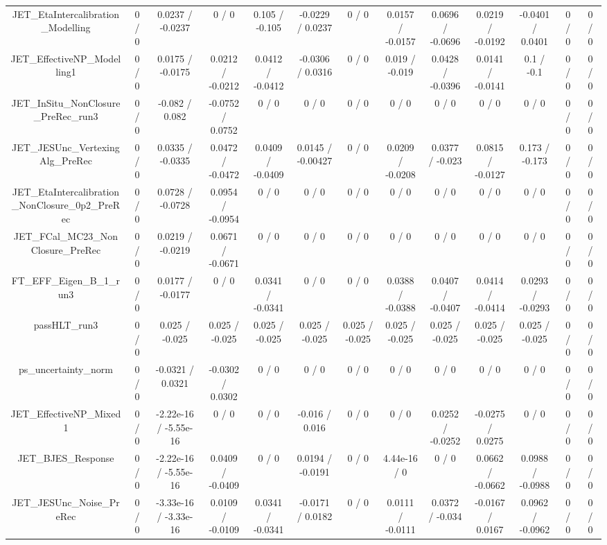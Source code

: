 \documentclass[10pt]{article}
\begin{document}
\begin{table}[htbp]
\begin{center}
\begin{tabular}{|c|c|c|c|c|c|c|c|c|c|c|c|c|}
  JET_EtaIntercalibration_Modelling & 0 / 0 & 0.0237 / -0.0237 & 0 / 0 & 0.105 / -0.105 & -0.0229 / 0.0237 & 0 / 0 & 0.0157 / -0.0157 & 0.0696 / -0.0696 & 0.0219 / -0.0192 & -0.0401 / 0.0401 & 0 / 0 & 0 / 0 \\ 
  JET_EffectiveNP_Modelling1 & 0 / 0 & 0.0175 / -0.0175 & 0.0212 / -0.0212 & 0.0412 / -0.0412 & -0.0306 / 0.0316 & 0 / 0 & 0.019 / -0.019 & 0.0428 / -0.0396 & 0.0141 / -0.0141 & 0.1 / -0.1 & 0 / 0 & 0 / 0 \\ 
  JET_InSitu_NonClosure_PreRec_run3 & 0 / 0 & -0.082 / 0.082 & -0.0752 / 0.0752 & 0 / 0 & 0 / 0 & 0 / 0 & 0 / 0 & 0 / 0 & 0 / 0 & 0 / 0 & 0 / 0 & 0 / 0 \\ 
  JET_JESUnc_VertexingAlg_PreRec & 0 / 0 & 0.0335 / -0.0335 & 0.0472 / -0.0472 & 0.0409 / -0.0409 & 0.0145 / -0.00427 & 0 / 0 & 0.0209 / -0.0208 & 0.0377 / -0.023 & 0.0815 / -0.0127 & 0.173 / -0.173 & 0 / 0 & 0 / 0 \\ 
  JET_EtaIntercalibration_NonClosure_0p2_PreRec & 0 / 0 & 0.0728 / -0.0728 & 0.0954 / -0.0954 & 0 / 0 & 0 / 0 & 0 / 0 & 0 / 0 & 0 / 0 & 0 / 0 & 0 / 0 & 0 / 0 & 0 / 0 \\ 
  JET_FCal_MC23_NonClosure_PreRec & 0 / 0 & 0.0219 / -0.0219 & 0.0671 / -0.0671 & 0 / 0 & 0 / 0 & 0 / 0 & 0 / 0 & 0 / 0 & 0 / 0 & 0 / 0 & 0 / 0 & 0 / 0 \\ 
  FT_EFF_Eigen_B_1_run3 & 0 / 0 & 0.0177 / -0.0177 & 0 / 0 & 0.0341 / -0.0341 & 0 / 0 & 0 / 0 & 0.0388 / -0.0388 & 0.0407 / -0.0407 & 0.0414 / -0.0414 & 0.0293 / -0.0293 & 0 / 0 & 0 / 0 \\ 
  passHLT_run3 & 0 / 0 & 0.025 / -0.025 & 0.025 / -0.025 & 0.025 / -0.025 & 0.025 / -0.025 & 0.025 / -0.025 & 0.025 / -0.025 & 0.025 / -0.025 & 0.025 / -0.025 & 0.025 / -0.025 & 0 / 0 & 0 / 0 \\ 
  ps_uncertainty_norm & 0 / 0 & -0.0321 / 0.0321 & -0.0302 / 0.0302 & 0 / 0 & 0 / 0 & 0 / 0 & 0 / 0 & 0 / 0 & 0 / 0 & 0 / 0 & 0 / 0 & 0 / 0 \\ 
  JET_EffectiveNP_Mixed1 & 0 / 0 & -2.22e-16 / -5.55e-16 & 0 / 0 & 0 / 0 & -0.016 / 0.016 & 0 / 0 & 0 / 0 & 0.0252 / -0.0252 & -0.0275 / 0.0275 & 0 / 0 & 0 / 0 & 0 / 0 \\ 
  JET_BJES_Response & 0 / 0 & -2.22e-16 / -5.55e-16 & 0.0409 / -0.0409 & 0 / 0 & 0.0194 / -0.0191 & 0 / 0 & 4.44e-16 / 0 & 0 / 0 & 0.0662 / -0.0662 & 0.0988 / -0.0988 & 0 / 0 & 0 / 0 \\ 
  JET_JESUnc_Noise_PreRec & 0 / 0 & -3.33e-16 / -3.33e-16 & 0.0109 / -0.0109 & 0.0341 / -0.0341 & -0.0171 / 0.0182 & 0 / 0 & 0.0111 / -0.0111 & 0.0372 / -0.034 & -0.0167 / 0.0167 & 0.0962 / -0.0962 & 0 / 0 & 0 / 0 \\ 

\end{tabular}
\end{center}
\end{table}
\end{document}
